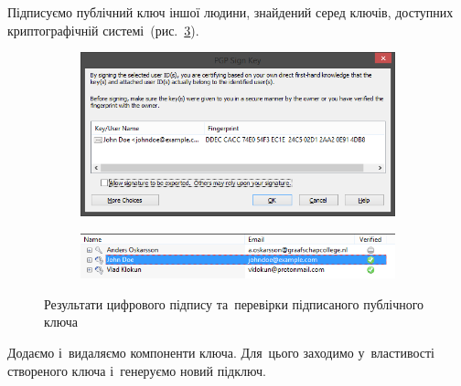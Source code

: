 \documentclass[
	a4paper,
	oneside,
	BCOR = 10mm,
	DIV = 12,
	12pt,
	headings = normal,
]{scrartcl}
\newlength{\gridunitwidth}
\begin{document}
		Підписуємо публічний ключ іншої людини, знайдений серед ключів, доступних криптографічній системі~(рис.~\ref{fig:sign-verify-key}).

		\begin{figure}[!htbp]
			\centering
			\begin{subfigure}[b]{8 \gridunitwidth - 1em / (2-1)}
				\includegraphics[width = \columnwidth]{./assets/p18.png}
				\caption{}
				\label{subfig:sign-key}
			\end{subfigure}%
			\hspace{1em}%
			\begin{subfigure}[b]{8 \gridunitwidth - 1em / (2-1)}
				\includegraphics[width = \columnwidth]{./assets/p19.png}
				\caption{}
				\label{subfig:verify-key}
			\end{subfigure}
			\caption{Результати цифрового підпису та~перевірки підписаного публічного ключа}
			\label{fig:sign-verify-key}
		\end{figure}

		Додаємо і~видаляємо компоненти ключа. Для~цього заходимо у~властивості створеного ключа і~генеруємо новий підключ.
\end{document}
